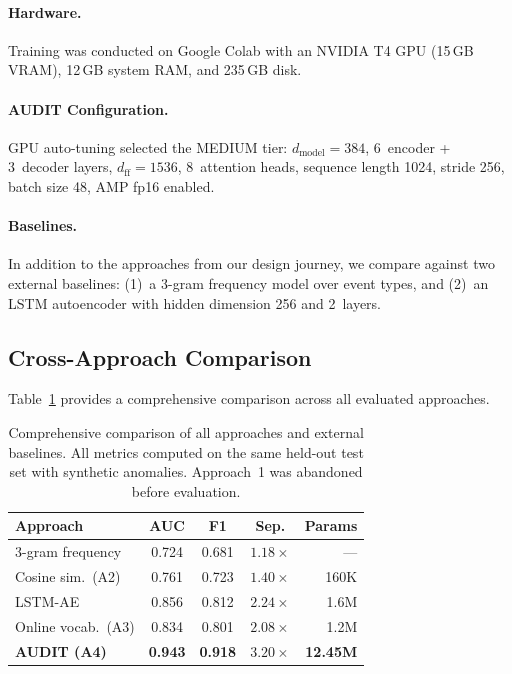 \documentclass[letterpaper,twocolumn,10pt]{article}
\begin{document}
\paragraph{Hardware.}
Training was conducted on Google Colab with an NVIDIA T4 GPU
(15\,GB VRAM), 12\,GB system RAM, and 235\,GB disk.

\paragraph{AUDIT Configuration.}
GPU auto-tuning selected the MEDIUM tier:
$d_{\text{model}}{=}384$, 6~encoder + 3~decoder layers,
$d_{\text{ff}}{=}1536$, 8~attention heads, sequence length 1024,
stride 256, batch size 48, AMP fp16 enabled.

\paragraph{Baselines.}
In addition to the approaches from our design journey, we compare
against two external baselines: (1)~a 3-gram frequency model over
event types, and (2)~an LSTM autoencoder with hidden dimension 256
and 2~layers.


\subsection{Cross-Approach Comparison}

Table~\ref{tab:cross_compare} provides a comprehensive comparison
across all evaluated approaches.

\begin{table}[t]
\centering
\caption{Comprehensive comparison of all approaches and external
baselines.  All metrics computed on the same held-out test set with
synthetic anomalies.  Approach~1 was abandoned before evaluation.}
\label{tab:cross_compare}
\small
\begin{tabular}{@{}lcccr@{}}
\toprule
\textbf{Approach} & \textbf{AUC} & \textbf{F1} &
  \textbf{Sep.} & \textbf{Params} \\
\midrule
3-gram frequency     & 0.724 & 0.681 & $1.18\times$ & --- \\
Cosine sim.\ (A2)    & 0.761 & 0.723 & $1.40\times$ & 160K \\
LSTM-AE              & 0.856 & 0.812 & $2.24\times$ & 1.6M \\
Online vocab.\ (A3)  & 0.834 & 0.801 & $2.08\times$ & 1.2M \\
\textbf{AUDIT (A4)}  & \textbf{0.943} & \textbf{0.918} &
  $\mathbf{3.20\times}$ & \textbf{12.45M} \\
\bottomrule
\end{tabular}
\end{table}
\end{document}
